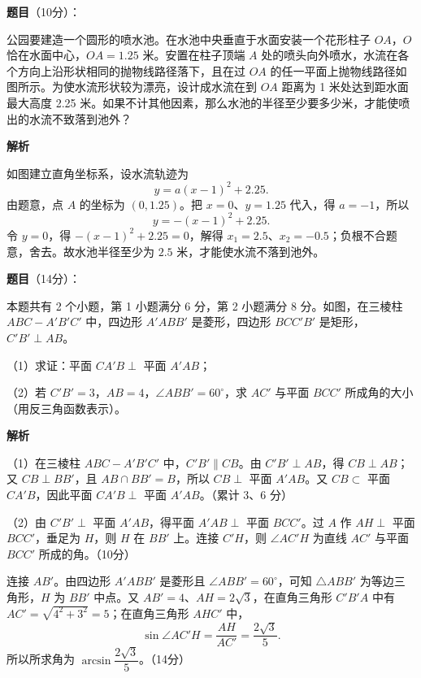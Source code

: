 \begin{answer}

\textbf{题目}（10分）：

公园要建造一个圆形的喷水池。在水池中央垂直于水面安装一个花形柱子 $OA$，$O$ 恰在水面中心，$OA=1.25$ 米。安置在柱子顶端 $A$ 处的喷头向外喷水，水流在各个方向上沿形状相同的抛物线路径落下，且在过 $OA$ 的任一平面上抛物线路径如图所示。为使水流形状较为漂亮，设计成水流在到 $OA$ 距离为 1 米处达到距水面最大高度 2.25 米。如果不计其他因素，那么水池的半径至少要多少米，才能使喷出的水流不致落到池外？
\nopagebreak[4]
\begin{center}\end{center}
\nopagebreak[4]
\textbf{解析}

如图建立直角坐标系，设水流轨迹为
\nopagebreak[4]
\[y=a(x-1)^2+2.25.\]
由题意，点 $A$ 的坐标为 $(0,1.25)$。把 $x=0$、$y=1.25$ 代入，得 $a=-1$，所以
\nopagebreak[4]
\[y=-(x-1)^2+2.25.\]
令 $y=0$，得 $-(x-1)^2+2.25=0$，解得 $x_1=2.5$、$x_2=-0.5$；负根不合题意，舍去。故水池半径至少为 $2.5$ 米，才能使水流不落到池外。


\end{answer}
\begin{answer}

\textbf{题目}（14分）：

本题共有 2 个小题，第 1 小题满分 6 分，第 2 小题满分 8 分。如图，在三棱柱 $ABC-A'B'C'$ 中，四边形 $A'ABB'$ 是菱形，四边形 $BCC'B'$ 是矩形，$C'B'\perp AB$。

（1）求证：平面 $CA'B\perp$ 平面 $A'AB$；

（2）若 $C'B'=3$，$AB=4$，$\angle ABB'=60^\circ$，求 $AC'$ 与平面 $BCC'$ 所成角的大小（用反三角函数表示）。
\nopagebreak[4]
\begin{center}\end{center}
\nopagebreak[4]
\textbf{解析}

（1）在三棱柱 $ABC-A'B'C'$ 中，$C'B'\parallel CB$。由 $C'B'\perp AB$，得 $CB\perp AB$；又 $CB\perp BB'$，且 $AB\cap BB'=B$，所以 $CB\perp$ 平面 $A'AB$。又 $CB\subset$ 平面 $CA'B$，因此平面 $CA'B\perp$ 平面 $A'AB$。（累计 3、6 分）

（2）由 $C'B'\perp$ 平面 $A'AB$，得平面 $A'AB\perp$ 平面 $BCC'$。过 $A$ 作 $AH\perp$ 平面 $BCC'$，垂足为 $H$，则 $H$ 在 $BB'$ 上。连接 $C'H$，则 $\angle AC'H$ 为直线 $AC'$ 与平面 $BCC'$ 所成的角。（10分）

连接 $AB'$。由四边形 $A'ABB'$ 是菱形且 $\angle ABB'=60^\circ$，可知 $\triangle ABB'$ 为等边三角形，$H$ 为 $BB'$ 中点。又 $AB'=4$、$AH=2\sqrt3$，在直角三角形 $C'B'A$ 中有 $AC'=\sqrt{4^2+3^2}=5$；在直角三角形 $AHC'$ 中，
\nopagebreak[4]
\[\sin\angle AC'H=\frac{AH}{AC'}=\frac{2\sqrt3}{5}.\]
所以所求角为 $\arcsin\dfrac{2\sqrt3}{5}$。（14分）


\end{answer}
